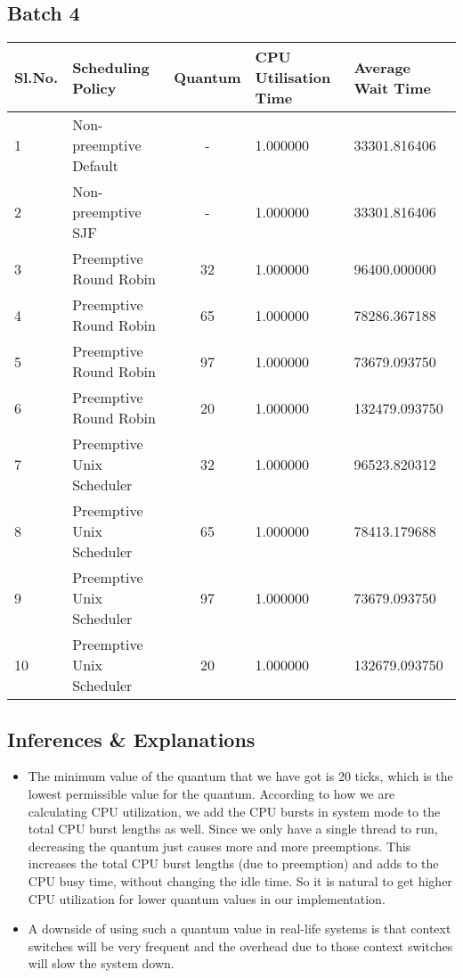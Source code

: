 \documentclass{article}
\begin{document}
\subsection{Batch 4}
\begin{center}
    \begin{tabular}{| l | l | c | l | l |}
    \hline
    Sl.No. & Scheduling Policy & Quantum & CPU Utilisation Time & Average Wait Time \\ \hline
    1 & Non-preemptive Default & - & 1.000000 & 33301.816406 \\
    2 & Non-preemptive SJF & - & 1.000000 & 33301.816406 \\
    3 & Preemptive Round Robin & 32 & 1.000000 & 96400.000000 \\
    4 & Preemptive Round Robin & 65 & 1.000000 & 78286.367188 \\
    5 & Preemptive Round Robin & 97 & 1.000000 & 73679.093750 \\
    6 & Preemptive Round Robin & 20 & 1.000000 & 132479.093750 \\
    7 & Preemptive Unix Scheduler & 32 & 1.000000 & 96523.820312 \\
    8 & Preemptive Unix Scheduler & 65 & 1.000000 & 78413.179688 \\
    9 & Preemptive Unix Scheduler & 97 & 1.000000 & 73679.093750 \\
    10 & Preemptive Unix Scheduler & 20 & 1.000000 & 132679.093750 \\
    \hline
    \end{tabular}
\end{center}
\subsection{Inferences \& Explanations}
\begin{itemize}
\item The minimum value of the quantum that we have got is 20 ticks, which is the lowest permissible value for the quantum. According to how we are calculating CPU utilization, we add the CPU bursts in system mode to the total CPU burst lengths as well. Since we only have a single thread to run, decreasing the quantum just causes more and more preemptions. This increases the total CPU burst lengths (due to preemption) and adds to the CPU busy time, without changing the idle time. So it is natural to get higher CPU utilization for lower quantum values in our implementation.
\item A downside of using such a quantum value in real-life systems is that context switches will be very frequent and the overhead due to those context switches will slow the system down.
\end{itemize}
\end{document}
